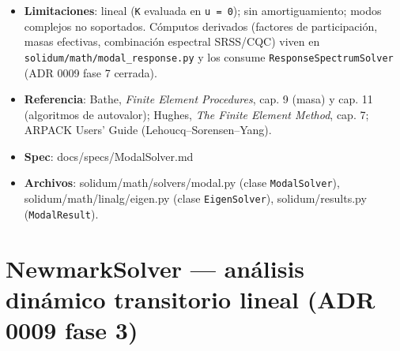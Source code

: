\documentclass[11pt,letterpaper,oneside]{report}
\begin{document}
\begin{itemize}
  \item \textbf{Limitaciones}: lineal (\texttt{K} evaluada en \texttt{u = 0}); sin amortiguamiento; modos complejos no soportados. Cómputos derivados (factores de participación, masas efectivas, combinación espectral SRSS/CQC) viven en \texttt{solidum/math/modal\_response.py} y los consume \texttt{ResponseSpectrumSolver} (ADR 0009 fase 7 cerrada).
  \item \textbf{Referencia}: Bathe, \textit{Finite Element Procedures}, cap. 9 (masa) y cap. 11 (algoritmos de autovalor); Hughes, \textit{The Finite Element Method}, cap. 7; ARPACK Users' Guide (Lehoucq--Sorensen--Yang).
  \item \textbf{Spec}: docs/specs/ModalSolver.md
  \item \textbf{Archivos}: solidum/math/solvers/modal.py (clase \texttt{ModalSolver}), solidum/math/linalg/eigen.py (clase \texttt{EigenSolver}), solidum/results.py (\texttt{ModalResult}).
\end{itemize}


\section{NewmarkSolver --- análisis dinámico transitorio lineal (ADR 0009 fase 3)}
\end{document}

